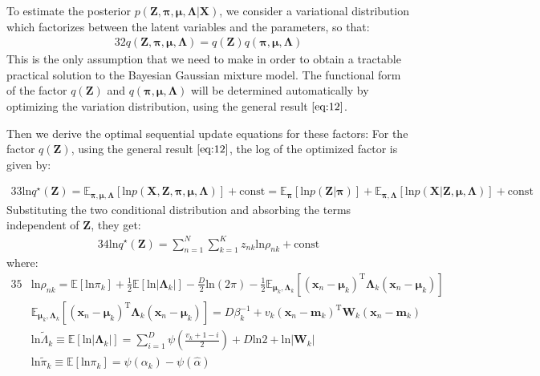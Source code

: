 \documentclass[letterpaper]{article}
\newcommand{\bx}{\mathbf{x}}
\newcommand{\bmu}{\boldsymbol{\mu}}
\newcommand{\bT}{\mathrm{T}}
\newcommand{\bm}{\mathbf{m}}
\newcommand{\bZ}{\mathbf{Z}}
\newcommand{\bpi}{\boldsymbol{\pi}}
\newcommand{\bX}{\mathbf{X}}
\newcommand{\bLambda}{\boldsymbol{\Lambda}}
\newcommand{\sumn}{\sum_{n=1}^N}
\newcommand{\sumk}{\sum_{k=1}^K}
\newcommand{\bW}{\mathbf{W}}
\begin{document}
To estimate the posterior $p(\bZ, \bpi, \bmu, \bLambda |\bX) $, we consider a variational distribution which factorizes between the latent variables and the parameters, so that:
\begin{alignat}{32}
q(\bZ, \bpi, \bmu, \bLambda) = q(\bZ) q(\bpi, \bmu, \bLambda)
\end{alignat}
This is the only assumption that we need to make in order to obtain a tractable practical solution to the Bayesian Gaussian mixture model. The functional form of the factor $q(\bZ)$ and $q(\bpi, \bmu, \bLambda)$ will be determined automatically by optimizing the variation distribution, using the general result $\eqref{eq:12}$.

Then we derive the optimal sequential update equations for these factors: For the factor $q(\bZ)$, using the general result $\eqref{eq:12}$, the log of the optimized factor is given by:

\begin{alignat}{33}
\mathrm{ln} q^{\star}(\bZ) = \mathbb{E}_{\bpi, \bmu, \bLambda} [\mathrm{ln} p(\bX, \bZ, \bpi, \bmu, \bLambda)] +  \mathrm{const}
= \mathbb{E}_{\bpi} [\mathrm{ln} p(\bZ | \bpi)] + \mathbb{E}_{\bpi, \bLambda} [\mathrm{ln} p(\bX | \bZ, \bmu, \bLambda)] + \mathrm{const}
\end{alignat}
Substituting the two conditional distribution and absorbing the terms independent of $\bZ$, they get:
\begin{alignat}{34}\label{eq:34}
\mathrm{ln} q^{\star}(\bZ) = \sumn \sumk z_{nk} \mathrm{ln}\rho_{nk} + \mathrm{const}
\end{alignat}
where:
\begin{alignat}{35}
&\mathrm{ln}\rho_{nk} = \mathbb{E}[\mathrm{ln}\pi_k] + \frac{1}{2} \mathbb{E}[\mathrm{ln} |\bLambda_k|] - \frac{D}{2}\mathrm{ln} (2\pi) - \frac{1}{2}\mathbb{E}_{\bmu_k, \bLambda_k}[(\bx_n - \bmu_k)^{\bT} \bLambda_k (\bx_n - \bmu_k)] \label{eq:35} \\
&\mathbb{E}_{\bmu_k, \bLambda_k}[(\bx_n - \bmu_k)^{\bT} \bLambda_k (\bx_n - \bmu_k)] = D \beta_k^{-1} + v_k (\bx_n - \bm_k)^{\bT} \bW_k (\bx_n - \bm_k) \label{eq:36} \\
&\mathrm{ln}\widetilde{\Lambda}_k \equiv \mathbb{E}[\mathrm{ln}|\bLambda_k|] = \sum_{i=1}^D \psi (\frac{v_k +1-i}{2}) + D \mathrm{ln}2 + \mathrm{ln}|\bW_k|\label{eq:37} \\ 
&\mathrm{ln}\widetilde{\pi}_k \equiv \mathbb{E}[\mathrm{ln}\pi_k] = \psi(\alpha_k) - \psi(\hat{\alpha})\label{eq:38}
\end{alignat}
\end{document}
